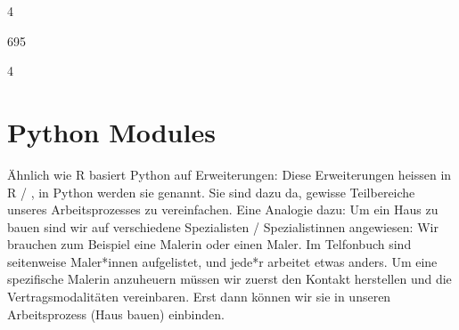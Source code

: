 \documentclass[letterpaper,10pt,english]{sphinxmanual}
\begin{document}
\begin{sphinxVerbatim}[commandchars=\\\{\}]
\end{sphinxVerbatim}

\begin{sphinxVerbatim}[commandchars=\\\{\}]
4
\end{sphinxVerbatim}

\begin{sphinxVerbatim}[commandchars=\\\{\}]
\end{sphinxVerbatim}

\begin{sphinxVerbatim}[commandchars=\\\{\}]
695
\end{sphinxVerbatim}

\begin{sphinxVerbatim}[commandchars=\\\{\}]
\end{sphinxVerbatim}

\begin{sphinxVerbatim}[commandchars=\\\{\}]
4
\end{sphinxVerbatim}

\begin{sphinxVerbatim}[commandchars=\\\{\}]
\end{sphinxVerbatim}


\chapter{Python Modules}
\label{\detokenize{01_03_Python_Module:python-modules}}\label{\detokenize{01_03_Python_Module::doc}}
Ähnlich wie R basiert Python auf Erweiterungen: Diese Erweiterungen heissen in R  / , in Python werden sie  genannt. Sie sind dazu da, gewisse Teilbereiche unseres Arbeitsprozesses zu vereinfachen. Eine Analogie dazu: Um ein Haus zu bauen sind wir auf verschiedene Spezialisten / Spezialistinnen angewiesen: Wir brauchen zum Beispiel eine Malerin oder einen Maler. Im Telfonbuch sind seitenweise Maler*innen aufgelistet, und jede*r arbeitet etwas anders. Um eine spezifische Malerin anzuheuern müssen wir zuerst den Kontakt herstellen und die Vertragsmodalitäten vereinbaren. Erst dann können wir sie in unseren Arbeitsprozess (Haus bauen) einbinden.
\end{document}
